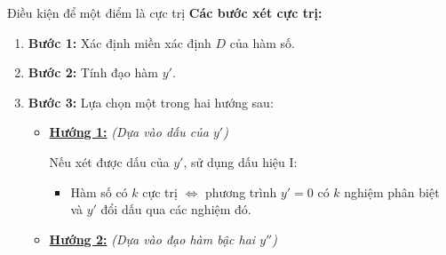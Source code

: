 \begin{lythuyetbox}{Điều kiện để một điểm là cực trị}
\vspace{1em}
\textbf{Các bước xét cực trị:}

\begin{enumerate}
    \item \textbf{Bước 1:} Xác định miền xác định $D$ của hàm số.
    \item \textbf{Bước 2:} Tính đạo hàm $y'$.
    \item \textbf{Bước 3:} Lựa chọn một trong hai hướng sau:
    \begin{itemize}
        \item[] \textbf{\underline{Hướng 1:}} \textit{(Dựa vào dấu của $y'$)}
        
        Nếu xét được dấu của $y'$, sử dụng dấu hiệu I:
        \begin{itemize}
            \item Hàm số có $k$ cực trị $\Leftrightarrow$ phương trình $y' = 0$ có $k$ nghiệm phân biệt và $y'$ đổi dấu qua các nghiệm đó.
        \end{itemize}
        
        \vspace{0.5em}
        \item[] \textbf{\underline{Hướng 2:}} \textit{(Dựa vào đạo hàm bậc hai $y''$)}
        

\end{itemize}
\end{enumerate}
\end{lythuyetbox}
